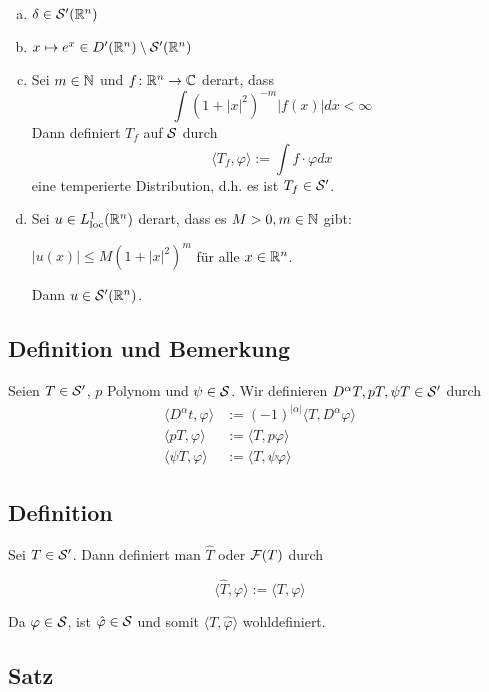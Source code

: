 \begin{enumerate}[a)]
  \item $\delta \in \mathcal{S}'(\mathbb{R}^n)$
  \item $x \mapsto e^x \in D'(\mathbb{R}^n) \setminus \mathcal{S}'(\mathbb{R}^n)$
  \item Sei $m \in \mathbb{N}$ und $f \colon \mathbb{R}^n \to \mathbb{C}$ derart, dass
    $$
    \int(1 + |x|^2)^{-m} |f(x)| dx < \infty
    $$
    Dann definiert $T_f$ auf $\mathcal{S}$ durch
    $$
    \langle T_f, \varphi\rangle := \int f \cdot \varphi dx
    $$
    eine temperierte Distribution, d.h. es ist $T_f \in \mathcal{S}'$.

  \item Sei $u \in L^1_{\operatorname{loc}}(\mathbb{R}^n)$ derart, dass es $M > 0, m \in \mathbb{N}$ gibt:

    $ |u(x)| \leq M(1 + |x|^2)^m$ für alle $x \in \mathbb{R}^n$.

    Dann $u \in \mathcal{S}'(\mathbb{R}^n)$.
\end{enumerate}

\subsection{Definition und Bemerkung}

Seien $T \in \mathcal{S}'$, $p$ Polynom und $\psi \in \mathcal{S}$.
Wir definieren $D^\alpha T, pT, \psi T \in \mathcal{S}'$ durch
\begin{align*}
  \langle D^\alpha t, \varphi \rangle &:= (-1)^{|\alpha|} \langle T, D^\alpha \varphi \rangle \\
  \langle pT, \varphi \rangle &:= \langle T, p \varphi \rangle \\
  \langle \psi T, \varphi \rangle &:=  \langle T, \psi \varphi \rangle
\end{align*}

\subsection{Definition}

Sei $T \in \mathcal{S}'$.
Dann definiert man $\hat T$ oder $\mathcal{F}(T)$ durch

$$
\langle \hat T, \varphi \rangle := \langle T, \varphi \rangle
$$

Da $\varphi \in \mathcal{S}$, ist $\hat \varphi \in \mathcal{S}$ und somit $\langle T, \hat\varphi \rangle$ wohldefiniert.

\subsection{Satz}

